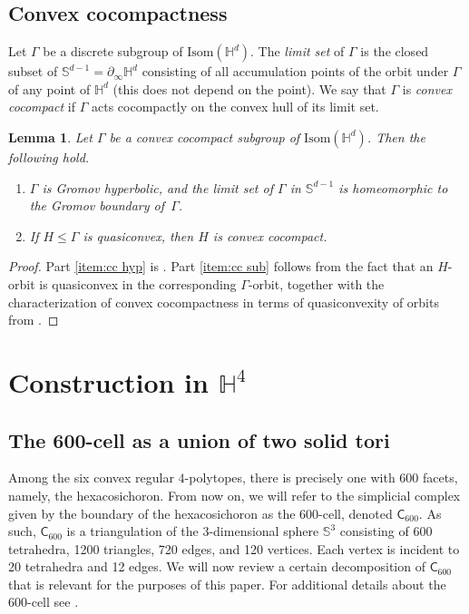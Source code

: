 \documentclass{amsart}
\theoremstyle{plain}
\newtheorem{lemma}[theorem]{Lemma}
\theoremstyle{definition}
\theoremstyle{remark}
\numberwithin{equation}{section}
\newcommand{\hh}{\mathbb H}
\newcommand{\six}{\mathsf{C}_{600}}
\newcommand{\Sb}{\mathbb{S}}
\renewcommand{\leq}{\leqslant}
\begin{document}

 \subsection{Convex cocompactness}

Let $\Gamma$ be a discrete subgroup of $\mathrm{Isom} (\hh^d)$. 
The \textit{limit set} of $\Gamma$ is the closed subset of $\Sb^{d-1} = \partial_\infty \hh^d$ consisting of all accumulation points of the orbit under $\Gamma$ of any point of $\hh^d$ (this does not depend on the point).
We say that $\Gamma$ is \textit{convex cocompact} if $\Gamma$ acts cocompactly on the convex hull of its limit set.


\begin{lemma}\label{lem:convexccpt}
Let $\Gamma$ be a convex cocompact subgroup of $\mathrm{Isom} (\hh^d)$.     Then the following hold.
\begin{enumerate}
    \item \label{item:cc hyp} $\Gamma$ is Gromov hyperbolic, and the limit set of $\Gamma$ in $\Sb^{d-1}$ is homeomorphic to the Gromov boundary of~$\Gamma$.

    \item \label{item:cc sub} If $H\leq \Gamma$ is quasiconvex, then $H$ is convex cocompact.
\end{enumerate}    
\end{lemma}
\begin{proof}
Part \eqref{item:cc hyp} is  \cite[Theorem 12]{SW01}.
    Part \eqref{item:cc sub} follows from the fact that an $H$-orbit  is quasiconvex in the corresponding $\Gamma$-orbit, together with the characterization of convex cocompactness in terms of quasiconvexity of orbits from \cite[Main Theorem]{SW01}.
\end{proof}

 


 

\section{Construction in \texorpdfstring{$\hh^4$}{H4}}

\subsection{The 600-cell as a union of two solid tori}

Among the six convex regular $4$-polytopes, there is precisely one with $600$ facets, namely, the hexacosichoron.
From now on, we will refer to the simplicial complex given by the boundary of the hexacosichoron as the $600$-cell, denoted $\six$. 
As such, $\six$ is a triangulation of the 3-dimensional sphere $\Sb^3$ consisting of 600 tetrahedra, 1200 triangles, 720 edges, and 120 vertices. Each vertex is incident to 20 tetrahedra and 12 edges.
We will now review a certain decomposition of $\six$ that is relevant for the purposes of this paper.
For additional details about the 600-cell see \cite[pp. 19-23, \S9]{CO70}.
\end{document}
